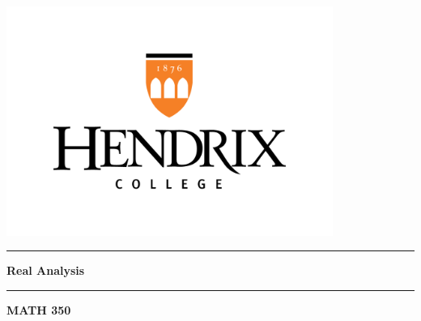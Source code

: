 \documentclass[12pt, oneside]{book}
\newcounter{BoxCounter}
\begin{document}

	

\newcommand{\titlestandin}[0]{Real Analysis}
\newcommand{\cussubtitle}[0]{MATH 350}
\newcommand{\startdate}[0]{August 26, 2024}
\newcommand{\customenddate}[0]{December 2, 2024}
\newcommand{\professor}[0]{Prof. Christopher Camfield, Ph.D.}




\begin{titlepage}
\begin{center}

\vspace*{-2cm}
\includegraphics[width=0.8\textwidth]{images/Hendrix Logo.png}\\
\vfill

\textcolor{horange}{\rule{\textwidth}{1.0pt}}

\vspace{2em}

{\huge \textbf{\titlestandin}}

\vspace{1em} %

\textcolor{horange}{\rule{\textwidth}{1.0pt}}

\vspace*{1\baselineskip}

{\LARGE \textbf{\cussubtitle}}


\end{center}
\end{titlepage}
\end{document}
